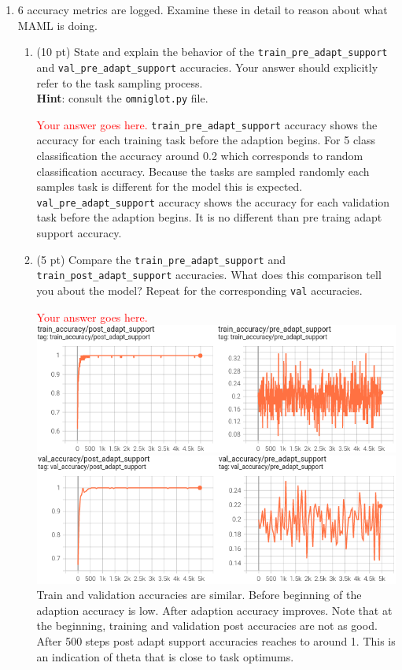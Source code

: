 \documentclass[12pt]{article}
\begin{document}
\begin{enumerate}
    \newpage
    \item 6 accuracy metrics are logged. Examine these in detail to reason about what MAML is doing.
    \begin{enumerate} %
        \item (10 pt) State and explain the behavior of the \texttt{train\_pre\_adapt\_support} and \texttt{val\_pre\_adapt\_support} accuracies. Your answer should explicitly refer to the task sampling process. \\ \textbf{Hint}: consult the \texttt{omniglot.py} file.

        \textcolor{red}{Your answer goes here.}
        \break \texttt{train\_pre\_adapt\_support} accuracy shows the accuracy for each training task before the adaption begins. For 5 class classification the accuracy around 0.2 which corresponds to random classification accuracy. Because the tasks are sampled randomly each samples task is different for the model this is expected.
        \break \texttt{val\_pre\_adapt\_support} accuracy shows the accuracy for each validation task before the adaption begins. It is no different than pre traing adapt support accuracy.
        \break
        \item (5 pt) Compare the \texttt{train\_pre\_adapt\_support} and \texttt{train\_post\_adapt\_support} accuracies. What does this comparison tell you about the model? Repeat for the corresponding \texttt{val} accuracies.

        \textcolor{red}{Your answer goes here.}
        \break
        \includegraphics[width=0.8\linewidth]{figures/maml-5-1-train-acc-post-pre}
        \break
        \includegraphics[width=0.8\linewidth]{figures/maml-5-1-val-acc-post-pre}
        \break
        Train and validation accuracies are similar. Before beginning of the adaption accuracy is low. After adaption accuracy improves. Note that at the beginning, training and validation post accuracies are not as good. After 500 steps post adapt support accuracies reaches to around 1. This is an indication of theta that is close to task optimums.


\end{enumerate}
\end{enumerate}
\end{document}
